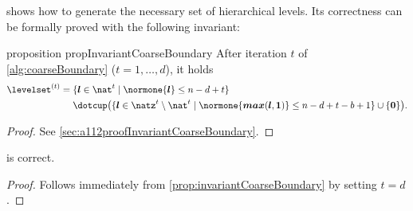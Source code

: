  shows how to generate the necessary set of
hierarchical levels.
Its correctness can be formally proved with the following invariant:
\begin{restatable}{%
  proposition%
}{%
  propInvariantCoarseBoundary%
}
  \label{prop:invariantCoarseBoundary}
  After iteration $t$ of \cref{alg:coarseBoundary}
  ($t = 1, \dotsc, d$), it holds
  \begin{equation}
    \label{eq:coarseInvariant}
    \begin{split}
      \levelset^{(t)}
      &= \{\*l \in \nat^t \mid \normone{\*l} \le n - d + t\}\\
      &\hphantom{{}={}} {} \dotcup \paren*{
        \{\*l \in \natz^t \setminus \nat^t \mid
        \normone{\vecmax(\*l, \*1)} \le n-d+t-b+1\} \cup \{\*0\}
      }.
    \end{split}
  \end{equation}
\end{restatable}
\begin{proof}
  See \cref{sec:a112proofInvariantCoarseBoundary}.
\end{proof}
\begin{shortcorollary}
  \label{cor:algCoarseBoundaryCorrectness}
   is correct.
\end{shortcorollary}
\begin{proof}
  Follows immediately from \cref{prop:invariantCoarseBoundary}
  by setting $t = d$.
\end{proof}

